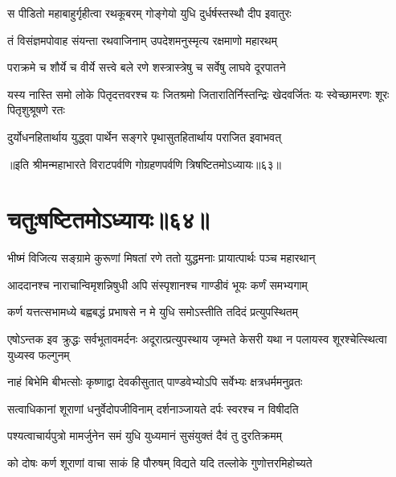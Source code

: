 \twolineshloka
{स पीडितो महाबाहुर्गृहीत्वा रथकूबरम्}
{गोङ्गेयो युधि दुर्धर्षस्तस्थौ दीप इवातुरः}


\twolineshloka
{तं विसंज्ञमपोवाह संयन्ता रथवाजिनाम्}
{उपदेशमनुस्मृत्य रक्षमाणो महारथम्}


\twolineshloka
{पराक्रमे च शौर्ये च वीर्ये सत्त्वे बले रणे}
{शस्त्रास्त्रेषु च सर्वेषु लाघवे दूरपातने}


\threelineshloka
{यस्य नास्ति समो लोके पितृदत्तवरश्च यः}
{जितश्रमो जितारातिर्निस्तन्द्रिः खेदवर्जितः}
{यः स्वेच्छामरणः शूरः पितृशुश्रूषणे रतः}


\twolineshloka
{दुर्योधनहितार्थाय युद्ध्वा पार्थेन सङ्गरे}
{पृथासुतहितार्थाय पराजित इवाभवत्}

॥इति श्रीमन्महाभारते विराटपर्वणि गोग्रहणपर्वणि त्रिषष्टितमोऽध्यायः॥६३॥

\chapter{चतुःषष्टितमोऽध्यायः॥६४॥}

\twolineshloka
{भीष्मं विजित्य सङ्ग्रामे कुरूणां मिषतां रणे}
{ततो युद्धमनाः प्रायात्पार्थः पञ्च महारथान्}


\twolineshloka
{आददानश्च नाराचान्विमृशन्निषुधी अपि}
{संस्पृशानश्च गाण्डीवं भूयः कर्णं समभ्यगाम्}




\twolineshloka
{कर्ण यत्तत्सभामध्ये बह्वबद्धं प्रभाषसे}
{न मे युधि समोऽस्तीति तदिदं प्रत्युपस्थितम्}


\threelineshloka
{एषोऽन्तक इव क्रुद्धः सर्वभूतावमर्दनः}
{अदूरात्प्रत्युपस्थाय जृम्भते केसरी यथा}
{न पलायस्व शूरश्चेत्स्थित्वा युध्यस्व फल्गुनम्}




\twolineshloka
{नाहं बिभेमि बीभत्सोः कृष्णाद्वा देवकीसुतात्}
{पाण्डवेभ्योऽपि सर्वेभ्यः क्षत्रधर्ममनुव्रतः}


\twolineshloka
{सत्वाधिकानां शूराणां धनुर्वेदोपजीविनाम्}
{दर्शनाञ्जायते दर्पः स्वरश्च न विषीदति}


\twolineshloka
{पश्यत्वाचार्यपुत्रो मामर्जुनेन समं युधि}
{युध्यमानं सुसंयुक्तं दैवं तु दुरतिक्रमम्}




\twolineshloka
{को दोषः कर्ण शूराणां वाचा साकं हि पौरुषम्}
{विद्यते यदि तल्लोके गुणोत्तरमिहोच्यते}


